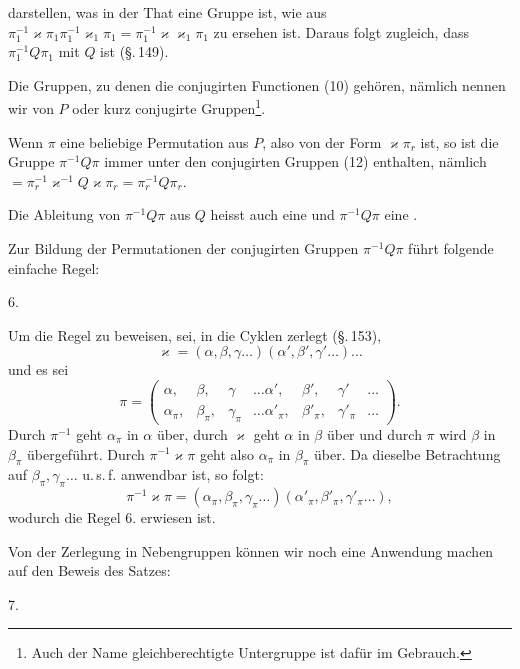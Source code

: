 
darstellen, was in der That eine Gruppe ist, wie aus $\pi_1^{-1}\varkappa\pi_1\pi_1^{-1}\varkappa_1\pi_1 = \pi_1^{-1}\varkappa\varkappa_1\pi_1$ zu ersehen ist. Daraus folgt zugleich, dass $\pi_1^{-1}Q\pi_1$ mit $Q$  ist (\S.\,149).

Die Gruppen, zu denen die conjugirten Functionen (10) gehören, nämlich
nennen wir  von $P$ oder kurz conjugirte Gruppen\footnote{Auch der Name \glqq{}gleichberechtigte Untergruppe\grqq{} ist dafür im Gebrauch.}.

Wenn $\pi$ eine beliebige Permutation aus $P$, also von der Form $\varkappa\pi_r$ ist, so ist die Gruppe $\pi^{-1}Q\pi$ immer unter den conjugirten Gruppen (12) enthalten, nämlich $= \pi_r^{-1}\varkappa^{-1}Q\varkappa\pi_r = \pi_r^{-1}Q\pi_r$.

Die Ableitung von $\pi^{-1}Q\pi$ aus $Q$ heisst auch eine  und $\pi^{-1}Q\pi$ eine .

Zur Bildung der Permutationen der conjugirten Gruppen $\pi^{-1}Q\pi$ führt folgende einfache Regel:

6. 

Um die Regel zu beweisen, sei, in die Cyklen zerlegt (\S.\,153),
\[
\varkappa = (\alpha,\beta,\gamma\ldots)(\alpha',\beta',\gamma'\ldots)\ldots
\]
und es sei
\[
\pi =
\begin{pmatrix}
\alpha, & \beta, & \gamma & \ldots \alpha', & \beta', & \gamma' & \ldots \\
\alpha_\pi, & \beta_\pi, & \gamma_\pi & \ldots \alpha'_\pi, & \beta'_\pi, & \gamma'_\pi & \ldots
\end{pmatrix}.
\]
Durch $\pi^{-1}$ geht $\alpha_\pi$ in $\alpha$ über, durch $\varkappa$ geht $\alpha$ in $\beta$ über und durch $\pi$ wird $\beta$ in $\beta_\pi$ übergeführt. Durch $\pi^{-1}\varkappa\pi$ geht also $\alpha_\pi$ in $\beta_\pi$ über. Da dieselbe Betrachtung auf $\beta_\pi, \gamma_\pi\ldots$ u.\,s.\,f. anwendbar ist, so folgt:
\[
\pi^{-1}\varkappa\pi = (\alpha_\pi,\beta_\pi,\gamma_\pi\ldots)(\alpha'_\pi,\beta'_\pi,\gamma'_\pi\ldots),
\]
wodurch die Regel 6. erwiesen ist.

Von der Zerlegung in Nebengruppen können wir noch eine Anwendung machen auf den Beweis des Satzes:

7. 
